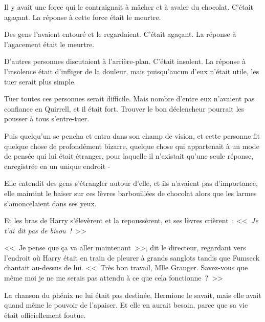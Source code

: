 \later

Il y avait une force qui le contraignait à mâcher et à avaler du chocolat. C'était agaçant. La réponse à cette force était le meurtre.

Des gens l'avaient entouré et le regardaient. C'était agaçant. La réponse à l'agacement était le meurtre.

D'autres personnes discutaient à l'arrière-plan. C'était insolent. La réponse à l'insolence était d'infliger de la douleur, mais puisqu'aucun d'eux n'était utile, les tuer serait plus simple.

Tuer toutes ces personnes serait difficile. Mais nombre d'entre eux n'avaient pas confiance en Quirrell, et il était fort. Trouver le bon déclencheur pourrait les pousser à tous s'entre-tuer.

Puis quelqu'un se pencha et entra dans son champ de vision, et cette personne fit quelque chose de profondément bizarre, quelque chose qui appartenait à un mode de pensée qui lui était étranger, pour laquelle il n'existait qu'une seule réponse, enregistrée en un unique endroit -

\later

Elle entendit des gens s'étrangler autour d'elle, et ils n'avaient pas d'importance, elle maintint le baiser sur ces lèvres barbouillées de chocolat alors que les larmes s'amoncelaient dans ses yeux.

Et les bras de Harry s'élevèrent et la repoussèrent, et ses lèvres crièrent~: <<~\emph{Je t'ai dit pas de bisou~!}~>>

\later

<<~Je pense que ça va aller maintenant~>>, dit le directeur, regardant vers l'endroit où Harry était en train de pleurer à grands sanglots tandis que Fumseck chantait au-dessus de lui. <<~Très bon travail, Mlle Granger. Savez-vous que même moi je ne me serais pas attendu à ce que cela fonctionne~?~>>

La chanson du phénix ne lui était pas destinée, Hermione le savait, mais elle avait quand même le pouvoir de l'apaiser. Et elle en aurait besoin, parce que sa vie était officiellement foutue. 

